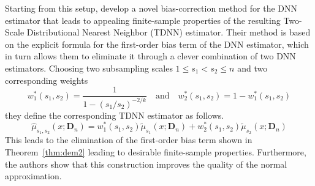 Starting from this setup, \citet{demirkaya_optimal_2024} develop a novel
bias-correction method for the DNN estimator that leads to appealing
finite-sample properties of the resulting Two-Scale Distributional Nearest
Neighbor (TDNN) estimator. Their method is based on the explicit formula for
the first-order bias term of the DNN estimator, which in turn allows them to
eliminate it through a clever combination of two DNN estimators. Choosing two
subsampling scales $1 \leq s_1 < s_2 \leq n$ and two corresponding weights
\begin{equation}
	w_{1}^{*}(s_1, s_2) = \frac{1}{1-(s_1/s_2)^{-2/k}}
	\quad\text{and}\quad
	w_2^{*}(s_1, s_2) = 1 - w_{1}^{*}(s_1, s_2)
\end{equation}
they define the corresponding TDNN estimator as follows.
\begin{equation}
	\hat{\mu}_{s_1, s_2}\left(x; \mathbf{D}_n\right)
	= w_{1}^{*}(s_1, s_2)\tilde{\mu}_{s_1}\left(x; \mathbf{D}_n\right) + w_2^{*}(s_1, s_2)\tilde{\mu}_{s_2}\left(x; \mathbf{D}_n\right)
\end{equation}
This leads to the elimination of the first-order bias term shown in Theorem~\ref{thm:dem2} leading to desirable finite-sample properties.
Furthermore, the authors show that this construction improves the quality of the normal approximation.

